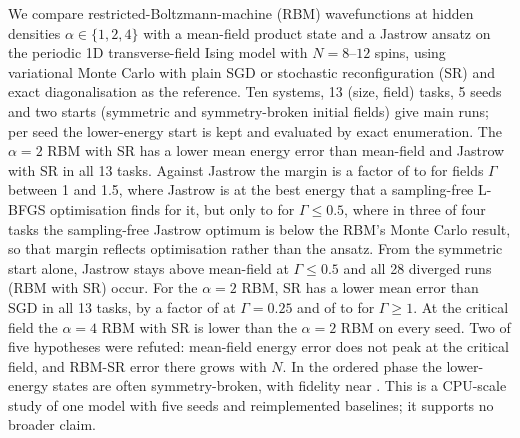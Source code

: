 We compare restricted-Boltzmann-machine (RBM) wavefunctions at hidden densities $\alpha\in\{1,2,4\}$ with a mean-field product state and a Jastrow ansatz on the periodic 1D transverse-field Ising model with $N=8$--$12$ spins, using variational Monte Carlo with plain SGD or stochastic reconfiguration (SR) and exact diagonalisation as the reference. Ten systems, 13 (size, field) tasks, 5 seeds and two starts (symmetric and symmetry-broken initial fields) give  main runs; per seed the lower-energy start is kept and evaluated by exact enumeration. The $\alpha{=}2$ RBM with SR has a lower mean energy error than mean-field and Jastrow with SR in all 13 tasks. Against Jastrow the margin is a factor of  to  for fields $\Gamma$ between 1 and 1.5, where Jastrow is at the best energy that a sampling-free L-BFGS optimisation finds for it, but only  to  for $\Gamma\le0.5$, where in three of four tasks the sampling-free Jastrow optimum is below the RBM's Monte Carlo result, so that margin reflects optimisation rather than the ansatz. From the symmetric start alone, Jastrow stays above mean-field at $\Gamma\le0.5$ and all 28 diverged runs (RBM with SR) occur. For the $\alpha{=}2$ RBM, SR has a lower mean error than SGD in all 13 tasks, by a factor of  at $\Gamma{=}0.25$ and of  to  for $\Gamma\ge1$. At the critical field the $\alpha{=}4$ RBM with SR is lower than the $\alpha{=}2$ RBM on every seed. Two of five hypotheses were refuted: mean-field energy error does not peak at the critical field, and RBM-SR error there grows with $N$. In the ordered phase the lower-energy states are often symmetry-broken, with fidelity near . This is a CPU-scale study of one model with five seeds and reimplemented baselines; it supports no broader claim.
